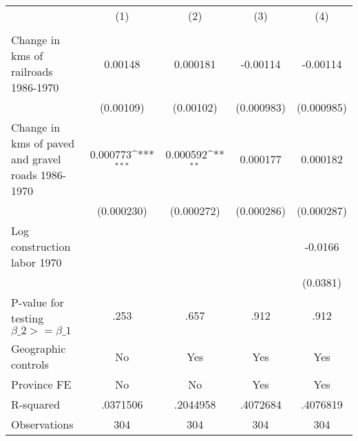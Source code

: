 {
\def\sym#1{\ifmmode^{#1}\else\(^{#1}\)\fi}
\begin{tabular}{l*{4}{c}}
\hline\hline
                &\multicolumn{1}{c}{(1)}&\multicolumn{1}{c}{(2)}&\multicolumn{1}{c}{(3)}&\multicolumn{1}{c}{(4)}\\
                &\multicolumn{1}{c}{}&\multicolumn{1}{c}{}&\multicolumn{1}{c}{}&\multicolumn{1}{c}{}\\
\hline
Change in kms of railroads 1986-1970&  0.00148         & 0.000181         & -0.00114         & -0.00114         \\
                &(0.00109)         &(0.00102)         &(0.000983)         &(0.000985)         \\
[1em]
Change in kms of paved and gravel roads 1986-1970& 0.000773\sym{***}& 0.000592\sym{**} & 0.000177         & 0.000182         \\
                &(0.000230)         &(0.000272)         &(0.000286)         &(0.000287)         \\
[1em]
Log construction labor 1970&                  &                  &                  &  -0.0166         \\
                &                  &                  &                  & (0.0381)         \\
\hline
P-value for testing $\beta\_{2} >= \beta\_{1}$&     .253         &     .657         &     .912         &     .912         \\
Geographic controls&       No         &      Yes         &      Yes         &      Yes         \\
Province FE     &       No         &       No         &      Yes         &      Yes         \\
R-squared       & .0371506         & .2044958         & .4072684         & .4076819         \\
Observations    &      304         &      304         &      304         &      304         \\
\hline\hline
\end{tabular}
}
